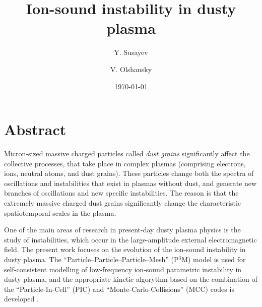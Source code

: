 \documentclass[twocolumn, prd, nobalancelastpage, superscriptaddress]{revtex4}
\begin{document}
\title{Ion-sound instability in dusty plasma}

\author{Y. Susayev}
\author{V. Olshansky}

\date{\today}


{\let\newpage\relax\maketitle}

\section*{Abstract}
\vspace{-4mm}
\noindent Micron-sized massive charged particles called \textit{dust grains} significantly affect the collective processes, that take place in complex plasmas (comprising electrons, ions, neutral atoms, and dust grains). These particles change both the spectra of oscillations and instabilities that exist in plasmas without dust, and generate new branches of oscillations and new specific instabilities. The reason is that the extremely massive charged dust grains significantly change the characteristic spatiotemporal scales in the plasma. 


One of the main areas of research in present-day dusty plasma physics is the study of instabilities, which occur in the large-amplitude external electromagnetic field. The present work focuses on the evolution of the ion-sound instability in dusty plasma. The “Particle–Particle–Particle–Mesh” (P$^3$M) model \cite{Hockney81} is used for self-consistent modelling of low-frequency ion-sound parametric instability in dusty plasma, and the appropriate kinetic algorythm based on the combination of the “Particle-In-Cell” (PIC) and “Monte-Carlo-Collisions” (MCC) codes is developed \cite{Olshan12}.
\end{document}
